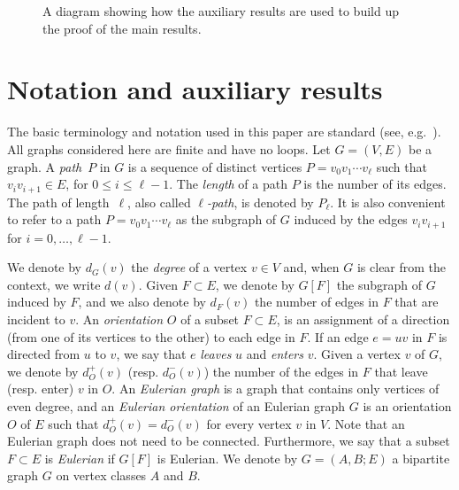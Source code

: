 \documentclass[12pt,reqno,a4paper]{amsart}
\begin{document}


 \begin{figure}[h]
 	\centering
 	\caption{A diagram showing how the auxiliary results are
            used to build up the proof of the main results.}
 	\label{fig:outline}
 \end{figure}




\section{Notation and auxiliary results}\label{sec:def}

The basic terminology and notation used in this paper are standard
(see, e.g.~\cite{Bo98,Di10}).  All graphs considered here are
finite and have no loops. 
Let $G=(V,E)$ be a graph.
A \emph{path}~$P$ in $G$ is a sequence of distinct vertices $P=v_0v_1\cdots v_\ell$ such
that $v_iv_{i+1}\in E$, for $0\leq i\leq \ell-1$. The
\emph{length} of a path $P$ is the number of its edges. The path of
length~\(\ell\),
also called \emph{$\ell$-path}, is denoted by $P_\ell$.  It is also
convenient to refer to a path \(P = v_0v_1\cdots v_\ell\)
as the subgraph of \(G\)
induced by the edges \(v_iv_{i+1}\) for \(i = 0,\ldots,\ell-1\).

 We denote by \(d_G(v)\) the 
\emph{degree} of a vertex \(v\in V\) and, when \(G\) is clear from the 
context, we write \(d(v)\). 
Given \(F\subset E\), we denote by $G[F]$ the subgraph of $G$ induced by $F$, and 
we also denote by \(d_{F}(v)\) the number of edges in \(F\) that are incident to \(v\).
An \emph{orientation} \(O\) of a subset \(F\subset E\),
is an assignment of a direction (from one of its vertices to the other) to each edge in \(F\).
If an edge \(e = uv\) in \(F\) is directed from \(u\) to \(v\),
we say that \(e\) \emph{leaves} \(u\) and \emph{enters} \(v\).
Given a vertex \(v\) of \(G\), we denote by \(d_O^+(v)\) (resp. \(d_O^-(v)\))
the number of the edges in \(F\) that leave (resp. enter) \(v\) in \(O\).
An \emph{Eulerian graph} is a graph that contains only vertices of even degree, and
an \emph{Eulerian orientation} of an Eulerian graph \(G\) 
is an orientation \(O\) of \(E\) such that \(d_O^+(v) = d_O^-(v)\) 
for every vertex \(v\) in \(V\). 
Note that an Eulerian graph does not need to be connected.
Furthermore, we say that a subset $F\subset E$ is \emph{Eulerian}
if \(G[F]\) is Eulerian.  We denote by $G=(A,B;E)$ a
bipartite graph $G$ on vertex classes $A$ and $B$.
 
\end{document}
